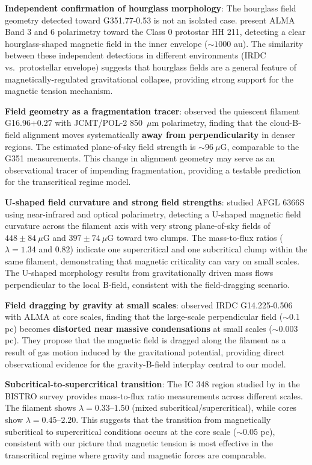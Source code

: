 \documentclass[11pt,a4paper]{article}
\begin{document}
\textbf{Independent confirmation of hourglass morphology}: The hourglass field geometry detected toward G351.77-0.53 is not an isolated case. \citet{Choi2025} present ALMA Band 3 and 6 polarimetry toward the Class 0 protostar HH 211, detecting a clear hourglass-shaped magnetic field in the inner envelope ($\sim1000$ au). The similarity between these independent detections in different environments (IRDC vs.\ protostellar envelope) suggests that hourglass fields are a general feature of magnetically-regulated gravitational collapse, providing strong support for the magnetic tension mechanism.

\textbf{Field geometry as a fragmentation tracer}: \citet{Gu2024} observed the quiescent filament G16.96+0.27 with JCMT/POL-2 850~$\mu$m polarimetry, finding that the cloud-B-field alignment moves systematically \textbf{away from perpendicularity} in denser regions. The estimated plane-of-sky field strength is $\sim96~\mu$G, comparable to the G351 measurements. This change in alignment geometry may serve as an observational tracer of impending fragmentation, providing a testable prediction for the transcritical regime model.

\textbf{U-shaped field curvature and strong field strengths}: \citet{Biswas2026} studied AFGL 6366S using near-infrared and optical polarimetry, detecting a U-shaped magnetic field curvature across the filament axis with very strong plane-of-sky fields of $448 \pm 84~\mu$G and $397 \pm 74~\mu$G toward two clumps. The mass-to-flux ratios ($\lambda = 1.34$ and $0.82$) indicate one supercritical and one subcritical clump within the same filament, demonstrating that magnetic criticality can vary on small scales. The U-shaped morphology results from gravitationally driven mass flows perpendicular to the local B-field, consistent with the field-dragging scenario.

\textbf{Field dragging by gravity at small scales}: \citet{AnezLopez2026} observed IRDC G14.225-0.506 with ALMA at core scales, finding that the large-scale perpendicular field ($\sim0.1$ pc) becomes \textbf{distorted near massive condensations} at small scales ($\sim0.003$ pc). They propose that the magnetic field is dragged along the filament as a result of gas motion induced by the gravitational potential, providing direct observational evidence for the gravity-B-field interplay central to our model.

\textbf{Subcritical-to-supercritical transition}: The IC 348 region studied by \citet{Choi2024b} in the BISTRO survey provides mass-to-flux ratio measurements across different scales. The filament shows $\lambda = 0.33$--$1.50$ (mixed subcritical/supercritical), while cores show $\lambda = 0.45$--$2.20$. This suggests that the transition from magnetically subcritical to supercritical conditions occurs at the core scale ($\sim0.05$ pc), consistent with our picture that magnetic tension is most effective in the transcritical regime where gravity and magnetic forces are comparable.
\end{document}
